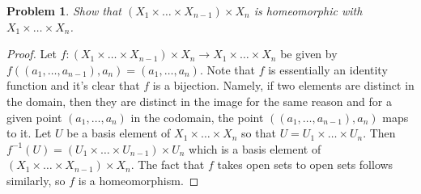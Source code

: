 \documentclass{article}
\newtheorem{problem}{Problem}
\begin{document}
\begin{problem}
Show that $(X_1 \times \dots \times X_{n-1}) \times X_n$ is homeomorphic with $X_1 \times \dots \times X_n$.
\end{problem}
\begin{proof}
Let $f : (X_1 \times \dots \times X_{n-1}) \times X_n  \to X_1 \times \dots \times X_n$ be given by $f((a_1, \dots , a_{n-1}), a_n) = (a_1, \dots , a_n)$. Note that $f$ is essentially an identity function and it's clear that $f$ is a bijection. Namely, if two elements are distinct in the domain, then they are distinct in the image for the same reason and for a given point $(a_1, \dots , a_n)$ in the codomain, the point $((a_1, \dots , a_{n-1}), a_n)$ maps to it. Let $U$ be a basis element of $X_1 \times \dots \times X_n$ so that $U = U_1 \times \dots \times U_n$. Then $f^{-1}(U) = (U_1 \times \dots \times U_{n-1}) \times U_n$ which is a basis element of $(X_1 \times \dots \times X_{n-1}) \times X_n$. The fact that $f$ takes open sets to open sets follows similarly, so $f$ is a homeomorphism.
\end{proof}
\end{document}
